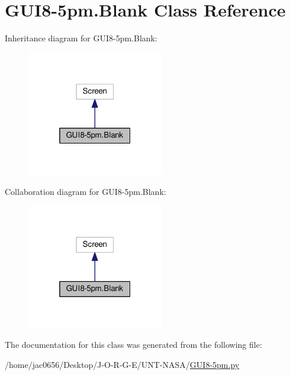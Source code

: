\hypertarget{classGUI8-5pm_1_1Blank}{}\section{G\+U\+I8-\/5pm.Blank Class Reference}
\label{classGUI8-5pm_1_1Blank}


Inheritance diagram for G\+U\+I8-\/5pm.Blank\+:\nopagebreak
\begin{figure}[H]
\begin{center}
\leavevmode
\includegraphics[width=169pt]{classGUI8-5pm_1_1Blank__inherit__graph}
\end{center}
\end{figure}


Collaboration diagram for G\+U\+I8-\/5pm.Blank\+:\nopagebreak
\begin{figure}[H]
\begin{center}
\leavevmode
\includegraphics[width=169pt]{classGUI8-5pm_1_1Blank__coll__graph}
\end{center}
\end{figure}


The documentation for this class was generated from the following file\+:\begin{DoxyCompactItemize}
\item 
/home/jac0656/\+Desktop/\+J-\/\+O-\/\+R-\/\+G-\/\+E/\+U\+N\+T-\/\+N\+A\+S\+A/\hyperlink{GUI8-5pm_8py}{G\+U\+I8-\/5pm.\+py}\end{DoxyCompactItemize}
